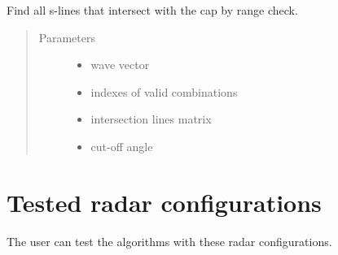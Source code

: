 \documentclass[letterpaper,12pt,english]{sphinxmanual}
\begin{document}
\begin{fulllineitems}
\label{\detokenize{functions:functions.slines_intersections}}
Find all s-lines that intersect with the cap by range check.
\begin{quote}\begin{description}
\item[{Parameters}] \leavevmode\begin{itemize}
\item {} 
 \textendash{} wave vector

\item {} 
 \textendash{} indexes of valid combinations

\item {} 
 \textendash{} intersection lines matrix

\item {} 
 \textendash{} cut-off angle

\end{itemize}

\end{description}\end{quote}

\end{fulllineitems}



\chapter{Tested radar configurations}
\label{\detokenize{radarconf:tested-radar-configurations}}\label{\detokenize{radarconf::doc}}
The user can test the algorithms with these radar configurations.

\label{\detokenize{radarconf:module-radarconf}}
\end{document}
